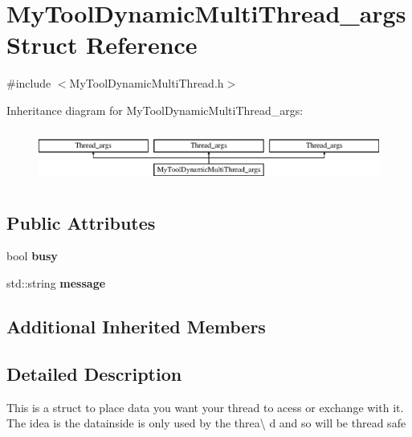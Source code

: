 \hypertarget{structMyToolDynamicMultiThread__args}{\section{My\-Tool\-Dynamic\-Multi\-Thread\-\_\-args Struct Reference}
\label{structMyToolDynamicMultiThread__args}
}


{\ttfamily \#include $<$My\-Tool\-Dynamic\-Multi\-Thread.\-h$>$}

Inheritance diagram for My\-Tool\-Dynamic\-Multi\-Thread\-\_\-args\-:\begin{figure}[H]
\begin{center}
\leavevmode
\includegraphics[height=1.777778cm]{structMyToolDynamicMultiThread__args}
\end{center}
\end{figure}
\subsection*{Public Attributes}
\begin{DoxyCompactItemize}
\item 
\hypertarget{structMyToolDynamicMultiThread__args_a2d4b96b18b6e91a4244473e9e28c881b}{bool {\bfseries busy}}\label{structMyToolDynamicMultiThread__args_a2d4b96b18b6e91a4244473e9e28c881b}

\item 
\hypertarget{structMyToolDynamicMultiThread__args_a4fe59813f550a1c10a2ab6527c580a23}{std\-::string {\bfseries message}}\label{structMyToolDynamicMultiThread__args_a4fe59813f550a1c10a2ab6527c580a23}

\end{DoxyCompactItemize}
\subsection*{Additional Inherited Members}


\subsection{Detailed Description}
This is a struct to place data you want your thread to acess or exchange with it. The idea is the datainside is only used by the threa\textbackslash{} d and so will be thread safe

